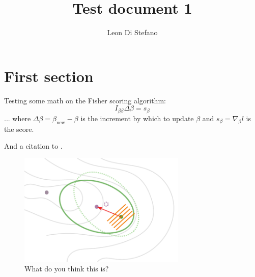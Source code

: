 \documentclass[11pt,fleqn]{article}
\title{Test document 1}
\author{Leon Di Stefano}
\begin{document}
\maketitle

\raggedright %

\vspace{0.1in}

\normalsize

\section*{First section}


Testing some math on the Fisher scoring algorithm:
\[
    I_{\beta\beta}\Delta\beta = s_\beta
\]
... where
$\Delta\beta = \beta_\text{new} - \beta$ is the increment by which to update
$\beta$
and
$s_\beta  = \nabla_\beta l$
is the score.

And a citation to \cite{greenIterativelyReweightedLeast1984}.

\begin{figure}
    \centering
    \includegraphics[width=8cm]{fig1}
    \caption{What do you think this is?}
    \label{fig:fig_1}
\end{figure}

\printbibliography
\end{document}
